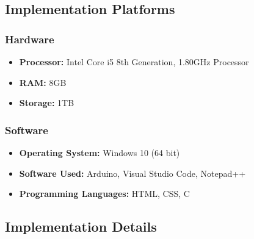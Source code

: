 \documentclass[12pt,a4paper,twocolumn,fleqn]{article}
\begin{document}
\subsection{Implementation Platforms}
\subsubsection{Hardware}
\begin{itemize}
    \item \textbf{Processor:} Intel Core i5 8th Generation, 1.80GHz Processor
    \item \textbf{RAM:} 8GB
    \item \textbf{Storage:} 1TB
\end{itemize}
\subsubsection{Software}
\begin{itemize}
    \item \textbf{Operating System:} Windows 10 (64 bit)
    \item \textbf{Software Used:} Arduino, Visual Studio Code, Notepad++
    \item \textbf{Programming Languages:} HTML, CSS, C
\end{itemize}
\subsection{Implementation Details}
\end{document}
